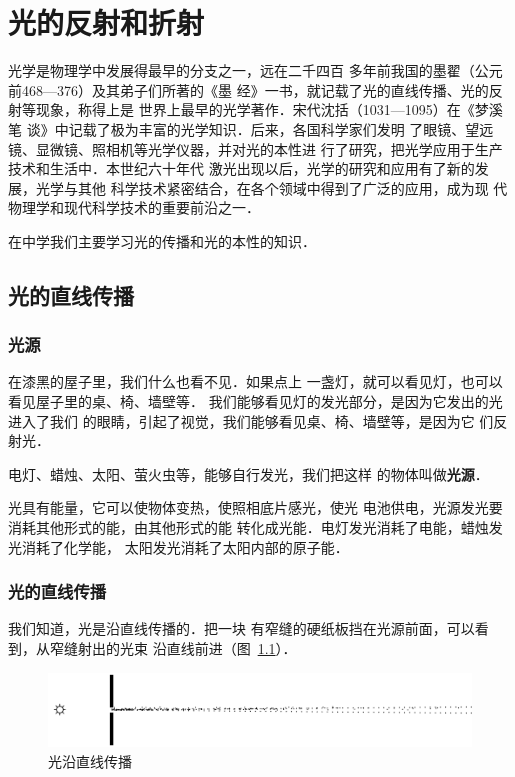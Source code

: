 \chapter{光的反射和折射}\label{chapter-reflection-and-refraction-of-light}

光学是物理学中发展得最早的分支之一，远在二千四百
多年前我国的墨翟（公元前468—376）及其弟子们所著的《墨
经》一书，就记载了光的直线传播、光的反射等现象，称得上是
世界上最早的光学著作．宋代沈括（1031—1095）在《梦溪笔
谈》中记载了极为丰富的光学知识．后来，各国科学家们发明
了眼镜、望远镜、显微镜、照相机等光学仪器，并对光的本性进
行了研究，把光学应用于生产技术和生活中．本世纪六十年代
激光出现以后，光学的研究和应用有了新的发展，光学与其他
科学技术紧密结合，在各个领域中得到了广泛的应用，成为现
代物理学和现代科学技术的重要前沿之一．

在中学我们主要学习光的传播和光的本性的知识．

\section{光的直线传播}
\subsection{光源}

在漆黑的屋子里，我们什么也看不见．如果点上
一盏灯，就可以看见灯，也可以看见屋子里的桌、椅、墙壁等．
我们能够看见灯的发光部分，是因为它发出的光进入了我们
的眼睛，引起了视觉，我们能够看见桌、椅、墙壁等，是因为它
们反射光．

电灯、蜡烛、太阳、萤火虫等，能够自行发光，我们把这样
的物体叫做\textbf{光源}．

光具有能量，它可以使物体变热，使照相底片感光，使光
电池供电，光源发光要消耗其他形式的能，由其他形式的能
转化成光能．电灯发光消耗了电能，蜡烛发光消耗了化学能，
太阳发光消耗了太阳内部的原子能．

\subsection{光的直线传播}

我们知道，光是沿直线传播的．把一块
有窄缝的硬纸板挡在光源前面，可以看到，从窄缝射出的光束
沿直线前进（图~\ref{fig_C_5-1}）．
\begin{figure}[htbp]
    \centering
    \includegraphics{fig/C/5-1.pdf}
    \caption{光沿直线传播}\label{fig_C_5-1}
\end{figure}

